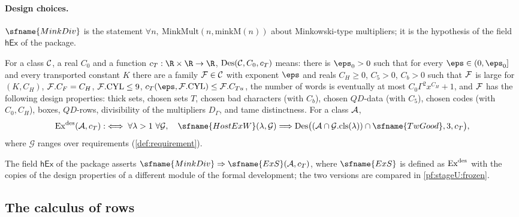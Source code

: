 \paragraph{Design choices.}
$\sfname{MinkDiv}$ is the statement $\forall n,\ \mathrm{MinkMult}(n,\mathrm{minkM}(n))$ about Minkowski-type multipliers; it
is the hypothesis of the field $\mathsf{hEx}$ of the package.

\begin{definition}\label{pf:stageU:designchoices}
For a class $\mathcal{C}$, a real $C_0$ and a function $c_T:\R\times\R\to\R$, $\mathrm{Des}(\mathcal{C},C_0,c_T)$ means: there is
$\eps_0>0$ such that for every $\eps\in(0,\eps_0]$ and every transported constant $K$ there are a family
$\mathcal{F}\in\mathcal{C}$ with exponent $\eps$ and reals $C_H\ge0$, $C_5>0$, $C_b>0$ such that $\mathcal{F}$ is large for
$(K,C_H)$, $\mathcal{F}.C_F=C_H$, $\mathcal{F}.\mathrm{CYL}\le9$, $c_T(\eps,\stageUFm.\mathrm{CYL})\le\stageUFm.C_{Tu}$, the number of
words is eventually at most $C_0\Gamma^2x^{C_H}+1$, and $\mathcal{F}$ has the following design properties: thick sets,
chosen sets $T$, chosen bad characters (with $C_b$), chosen $QD$-data (with $C_5$), chosen codes (with $C_0,C_H$), boxes,
$QD$-rows, divisibility of the multipliers $D_\Gamma$, and tame distinctness. For a class $\mathcal{A}$,
\[
\stageUEx^{\mathrm{des}}(\stageUA,c_T):\iff\forall\lambda>1\ \forall\mathcal G,\quad
\sfname{HostExW}(\lambda,\mathcal G)\Longrightarrow
\stageUDes\bigl((\stageUA\cap\mathcal G.\mathrm{cls}(\lambda))\cap\sfname{TwGood},3,c_T\bigr),
\]
where $\mathcal G$ ranges over requirements (\cref{def:requirement}).
\end{definition}

The field $\mathsf{hEx}$ of the package asserts $\sfname{MinkDiv}\Rightarrow\sfname{ExS}(\stageUA,c_T)$, where
$\sfname{ExS}$ is defined as $\mathrm{Ex}^{\mathrm{des}}$ with the copies of the design properties of a different module of the
formal development; the two versions are compared in \cref{pf:stageU:frozen}.

\subsection{The calculus of rows}\label{sec:pf:stageU:calculus}

